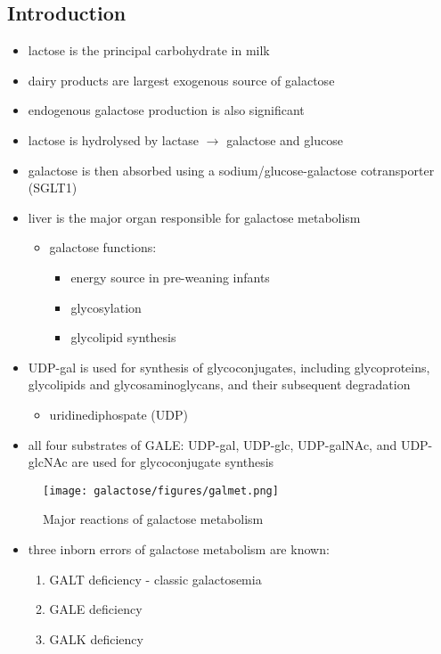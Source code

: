\documentclass[12pt]{scrartcl}
\begin{document}
\subsection{Introduction}
\label{sec:org12507db}
\begin{itemize}
\item lactose is the principal carbohydrate in milk
\item dairy products are largest exogenous source of galactose
\item endogenous galactose production is also significant
\item lactose is hydrolysed by lactase \(\to\) galactose and glucose
\item galactose is then absorbed using a sodium/glucose-galactose cotransporter (SGLT1)
\item liver is the major organ responsible for galactose metabolism
\begin{itemize}
\item galactose functions:
\begin{itemize}
\item energy source in pre-weaning infants
\item glycosylation
\item glycolipid synthesis
\end{itemize}
\end{itemize}

\item UDP-gal is used for synthesis of glycoconjugates, including
glycoproteins, glycolipids and glycosaminoglycans, and their
subsequent degradation
\begin{itemize}
\item uridinediphospate (UDP)
\end{itemize}
\item all four substrates of GALE: UDP-gal, UDP-glc, UDP-galNAc, and
UDP-glcNAc are used for glycoconjugate synthesis
\end{itemize}

\begin{figure}[htbp]
\centering
\texttt{[image: galactose/figures/galmet.png]}
\caption{\label{fig:orgcc127e0}Major reactions of galactose metabolism}
\end{figure}

\begin{itemize}
\item three inborn errors of galactose metabolism are known:
\begin{enumerate}
\item GALT deficiency - classic galactosemia
\item GALE deficiency
\item GALK deficiency
\end{enumerate}
\end{itemize}
\end{document}

